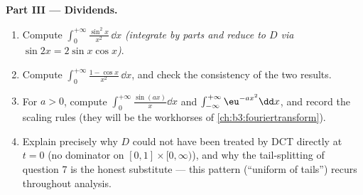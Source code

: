 \begin{problem}
\medskip
\noindent\textbf{Part III --- Dividends.}
\begin{enumerate}[resume]
  \item Compute $\int_0^{+\infty}\frac{\sin^2x}{x^2}\,\dd x$
        \emph{(integrate by parts and reduce to $D$ via $\sin
        2x = 2\sin x\cos x$)}.
  \item Compute $\int_0^{+\infty}\frac{1 -
        \cos x}{x^2}\,\dd x$, and check the consistency of the
        two results.
  \item For $a > 0$, compute
        $\int_0^{+\infty}\frac{\sin(ax)}x\dd x$ and
        $\int_{-\infty}^{+\infty}\eu^{-ax^2}\dd x$, and record
        the scaling rules (they will be the workhorses of
        \cref{ch:b3:fouriertransform}).
  \item Explain precisely why $D$ could not have been treated
        by DCT directly at $t = 0$ (no  dominator on
        $[0,1]\times[0,\infty)$), and why the tail-splitting of
        question 7 is the honest substitute --- this pattern
        (``uniform  of tails'') recurs throughout
        analysis.
\end{enumerate}


\end{problem}

